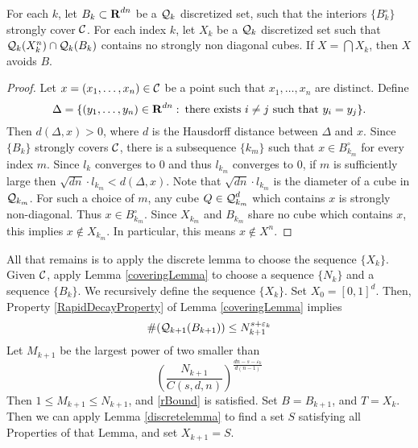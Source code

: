 \begin{lemma} \label{stronglydiagonal}
	For each $k$, let $B_k \subset \operatorname{\mathbf{R}}^{dn}$ be a $\operatorname{\mathcal{Q}}_k$ discretized set, such that the interiors $\{ B_k^\circ \}$ strongly cover $\operatorname{\mathcal{C}}$. For each index $k$, let $X_k$ be a $\operatorname{\mathcal{Q}}_k$ discretized set such that $\operatorname{\mathcal{Q}}_k(X_k^n) \cap \operatorname{\mathcal{Q}}_k(B_k)$ contains no strongly non diagonal cubes. If $X = \bigcap X_k$, then $X$ avoids $B$.
\end{lemma}
\begin{proof}
	Let $x = (x_1, \dots, x_n) \in \operatorname{\mathcal{C}}$ be a point such that $x_1, \dots, x_n$ are distinct. Define
	\[ \Delta = \{ (y_1, \dots, y_n) \in \operatorname{\mathbf{R}}^{dn} \operatorname{\colon} \text{there exists $i \neq j$ such that $y_i = y_j$} \}. \]
	Then $d(\Delta,x) > 0$, where $d$ is the Hausdorff distance between $\Delta$ and $x$. Since $\{ B_k \}$ strongly covers $\operatorname{\mathcal{C}}$, there is a subsequence $\{ k_m \}$ such that $x \in B_{k_m}^\circ$ for every index $m$. Since $l_k$ converges to 0 and thus $l_{k_m}$ converges to $0$, if $m$ is sufficiently large then $\sqrt{dn} \cdot l_{k_m} < d(\Delta,x)$. Note that $\sqrt{dn} \cdot l_{k_m}$ is the diameter of a cube in $\operatorname{\mathcal{Q}}_{k_m}$. For such a choice of $m$, any cube $Q \in \operatorname{\mathcal{Q}}_{k_m}^d$ which contains $x$ is strongly non-diagonal. Thus $x \in B_{k_m}^\circ$. Since $X_{k_m}$ and $B_{k_m}$ share no cube which contains $x$, this implies $x \not \in X_{k_m}$. In particular, this means $x \not \in X^n$.
\end{proof}

All that remains is to apply the discrete lemma to choose the sequence $\{ X_k \}$. Given $\operatorname{\mathcal{C}}$, apply Lemma \ref{coveringLemma} to choose a sequence $\{ N_k \}$ and a sequence $\{ B_k \}$. We recursively define the sequence $\{ X_k \}$. Set $X_0 = [0,1]^d$. Then, Property \ref{RapidDecayProperty} of Lemma \ref{coveringLemma} implies
%
\[ \#(\operatorname{\mathcal{Q}}_{k+1}(B_{k+1})) \leq N_{k+1}^{s + \varepsilon_k} \]
%
Let $M_{k+1}$ be the largest power of two smaller than
%
\begin{equation} \label{equation9249815935} \left( \frac{N_{k+1}}{C(s,d,n)} \right)^{\frac{dn - s -\varepsilon_k}{d(n-1)}} \end{equation}
%
Then $1 \leq M_{k+1} \leq N_{k+1}$, and \eqref{rBound} is satisfied. Set $B = B_{k+1}$, and $T = X_k$. Then we can apply Lemma \ref{discretelemma} to find a set $S$ satisfying all Properties of that Lemma, and set $X_{k+1} = S$.

